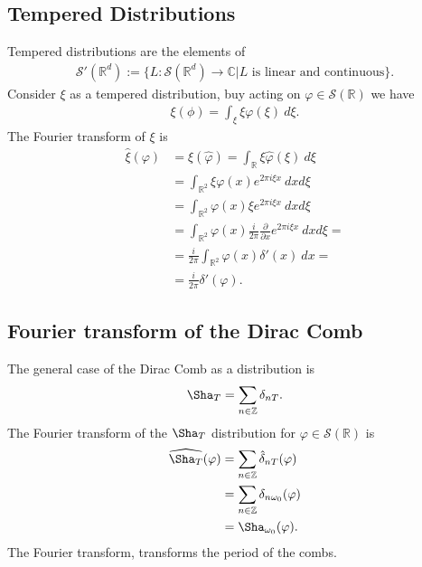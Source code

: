 \subsection{Tempered Distributions}
Tempered distributions are the elements of
\begin{align}
    \mathcal{S}'(\mathbb{R}^d) :=
    \bigg\{
        L: \mathcal{S}(\mathbb{R}^d) \rightarrow \mathbb{C} | \text{$L$ is
        linear and continuous}
    \bigg\}.
\end{align}
Consider $\xi$ as a tempered distribution, buy acting on $\varphi \in
\mathcal{S}(\mathbb{R})$ we have
\begin{align}
    \xi(\phi) = \int_\xi \xi \varphi(\xi)\ d\xi.
\end{align}
The Fourier transform of $\xi$ is
\begin{align}
    \hat{\xi}(\varphi)
    &=\xi(\hat{\varphi})
    = \int_\mathbb{R} \xi \hat{\varphi}(\xi)\ d\xi\\
    &= \int_{\mathbb{R}^2}\xi \varphi(x) e^{2\pi i\xi x}\ dxd\xi\\
    &= \int_{\mathbb{R}^2}\varphi(x) \xi e^{2\pi i \xi x}\ dxd\xi\\
    &=\int_{\mathbb{R}^2}\varphi(x)\frac{i}{2\pi} \frac{\partial}{\partial x}
     e^{2\pi i \xi x}\ dxd\xi =\\
    &=\frac{i}{2\pi}\int_{\mathbb{R}^2}\varphi(x)\delta'(x)\ dx=\\
    &=\frac{i}{2\pi} \delta'(\varphi).
\end{align}
\subsection{Fourier transform of the Dirac Comb}
The general case of the Dirac Comb as a distribution is
\begin{align}
    \Sha_T = \sum_{n \in \mathbb{Z}} \delta_{nT}.
\end{align}
The Fourier transform of the $\Sha_T$ distribution for $\varphi \in
\mathcal{S}(\mathbb{R})$ is
\begin{align}
    \widehat{\Sha_T}(\varphi)
    &= \sum_{n\in\mathbb{Z}} \hat{\delta}_{nT}(\varphi)\\
    &= \sum_{n\in\mathbb{Z}} \delta_{n\omega_0}(\varphi)\\
    &=\Sha_{\omega_0}(\varphi).
\end{align}
The Fourier transform, transforms the period of the combs.
